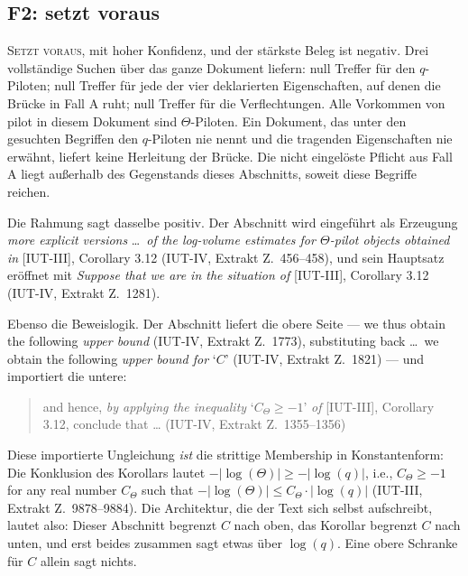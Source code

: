 \documentclass[11pt,a4paper]{article}
\theoremstyle{definition}
\newcommand{\anchor}[2]{(#1, Extrakt Z.~#2)}
\begin{document}
\subsection{F2: setzt voraus}

\textsc{Setzt voraus}, mit hoher Konfidenz, und der stärkste Beleg ist negativ.
Drei vollständige Suchen über das ganze Dokument liefern: null Treffer für den
$q$-Piloten; null Treffer für jede der vier deklarierten Eigenschaften, auf denen
die Brücke in Fall A ruht; null Treffer für die Verflechtungen. Alle Vorkommen
von \glqq pilot\grqq{} in diesem Dokument sind $\Theta$-Piloten. Ein Dokument, das unter den
gesuchten Begriffen den $q$-Piloten nie nennt und die tragenden Eigenschaften nie
erwähnt, liefert keine Herleitung der Brücke. Die nicht eingelöste Pflicht aus
Fall A liegt außerhalb des Gegenstands dieses Abschnitts, soweit diese Begriffe
reichen.

Die Rahmung sagt dasselbe positiv. Der Abschnitt wird eingeführt als Erzeugung
\glqq \emph{more explicit versions} \dots\ \emph{of the log-volume estimates for
$\Theta$-pilot objects obtained in} [IUT-III], Corollary 3.12\grqq
\anchor{IUT-IV}{456--458}, und sein Hauptsatz eröffnet mit \glqq \emph{Suppose that we
are in the situation of} [IUT-III], Corollary 3.12\grqq
\anchor{IUT-IV}{1281}.

Ebenso die Beweislogik. Der Abschnitt liefert die obere Seite --- \glqq we thus obtain
the following \emph{upper bound}\grqq{} \anchor{IUT-IV}{1773}, \glqq substituting back
\dots\ we obtain the following \emph{upper bound for} `$C$'\grqq
\anchor{IUT-IV}{1821} --- und importiert die untere:

\begin{quote}\small
\glqq and hence, \emph{by applying the inequality} `$C_\Theta \ge -1$' \emph{of} [IUT-III],
Corollary 3.12, conclude that \dots\grqq{} \hfill\anchor{IUT-IV}{1355--1356}
\end{quote}

Diese importierte Ungleichung \emph{ist} die strittige Membership in
Konstantenform: Die Konklusion des Korollars lautet
$-|\log(\Theta)| \ge -|\log(q)|$, \glqq i.e., $C_\Theta \ge -1$ for any real number $C_\Theta$
such that $-|\log(\Theta)| \le C_\Theta \cdot |\log(q)|$\grqq{} \anchor{IUT-III}{9878--9884}. Die
Architektur, die der Text sich selbst aufschreibt, lautet also: Dieser Abschnitt
begrenzt $C$ nach oben, das Korollar begrenzt $C$ nach unten, und erst beides
zusammen sagt etwas über $\log(q)$. Eine obere Schranke für $C$ allein sagt
nichts.
\end{document}
